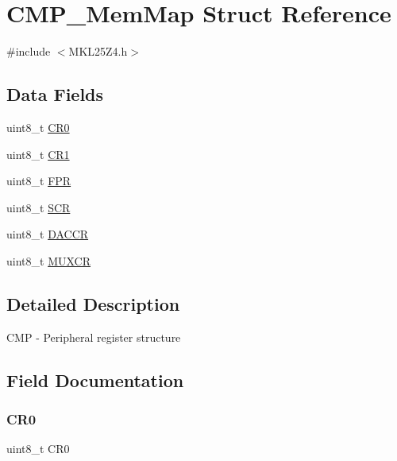 \hypertarget{struct_c_m_p___mem_map}{}\section{C\+M\+P\+\_\+\+Mem\+Map Struct Reference}
\label{struct_c_m_p___mem_map}


{\ttfamily \#include $<$M\+K\+L25\+Z4.\+h$>$}

\subsection*{Data Fields}
\begin{DoxyCompactItemize}
\item 
uint8\+\_\+t \hyperlink{struct_c_m_p___mem_map_a2ae7fd9dd23ca10cb47550c1fc727440}{C\+R0}
\item 
uint8\+\_\+t \hyperlink{struct_c_m_p___mem_map_af9a269aaa5da5759c86b43f3cd68e208}{C\+R1}
\item 
uint8\+\_\+t \hyperlink{struct_c_m_p___mem_map_a190f8642b1bdc9d1252673a28b6b6df6}{F\+PR}
\item 
uint8\+\_\+t \hyperlink{struct_c_m_p___mem_map_aa43a01363ae5f82700d71abfd78b321d}{S\+CR}
\item 
uint8\+\_\+t \hyperlink{struct_c_m_p___mem_map_a51dd2d2a0528dfb19a45debc50dc8a51}{D\+A\+C\+CR}
\item 
uint8\+\_\+t \hyperlink{struct_c_m_p___mem_map_ae5069d9ba4618ae45636fcb5b2061169}{M\+U\+X\+CR}
\end{DoxyCompactItemize}


\subsection{Detailed Description}
C\+MP -\/ Peripheral register structure 

\subsection{Field Documentation}
\mbox{\label{struct_c_m_p___mem_map_a2ae7fd9dd23ca10cb47550c1fc727440}} 
\subsubsection{\texorpdfstring{C\+R0}{CR0}}
{\footnotesize\ttfamily uint8\+\_\+t C\+R0}

